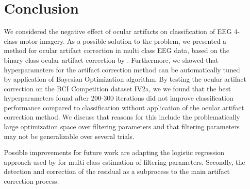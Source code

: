 \section{Conclusion}
We considered the negative effect of ocular artifacts on classification of EEG 4-class motor imagery. As a possible solution to the problem, we presented a method for ocular artifact correction in multi class EEG data, based on the binary class ocular artifact correction by \citep{li2015ocular}. Furthermore, we showed that hyperparameters for the artifact correction method can be automatically tuned by application of Bayesian Optimization algorithm. By testing the ocular artifact correction on the BCI Competition dataset IV2a, we  we found that the best hyperparameters found after 200-300 iterations did not improve classification performance compared to classification without application of the ocular artifact correction method. We discuss that reasons for this include the problematically large optimization space over filtering parameters and that filtering parameters may not be generalizable over several trials.

Possible improvements for future work are adapting the logistic regression approach used by \citep{li2015ocular} for multi-class estimation of filtering parameters. Secondly, the detection and correction of the residual as a subprocess to the main artifact correction process. 
